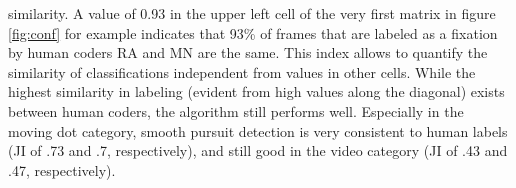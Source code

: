     similarity. A value of 0.93 in the upper left cell of the very first matrix in figure \ref{fig:conf} for example
    indicates that 93\% of frames that are labeled as a fixation by human coders RA and MN are the same. This index allows
    to quantify the similarity of classifications independent from values in other cells. While the highest similarity in
    labeling (evident from high values along the diagonal) exists between human coders, the algorithm still performs well.
    Especially in the moving dot category, smooth pursuit detection is very consistent to human labels (JI of .73 and .7,
    respectively), and still good in the video category (JI of .43 and .47, respectively). \\


